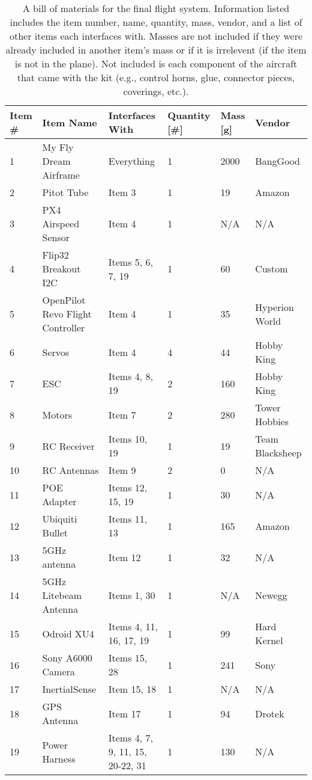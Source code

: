 \documentclass[]{auvsi_doc}
\begin{document}
	\begin{table}[h!]
		\begin{center}
			\caption{A bill of materials for the final flight system. Information listed includes the item number, name, quantity, mass, vendor, and a list of other items each interfaces with. Masses are not included if they were already included in another item's mass or if it is irrelevent (if the item is not in the plane). Not included is each component of the aircraft that came with the kit (e.g., control horns, glue, connector pieces, coverings, etc.).}
			\label{table:BOM}
			\begin{tabular}{p{1cm}p{4cm}p{3cm}p{1.5cm}p{1cm}p{2.5cm}}
				\toprule
				Item \# & Item Name & Interfaces With & Quantity [\#] & Mass [g] & Vendor \\
				\midrule
				1 & My Fly Dream Airframe & Everything & 1 & 2000 & BangGood   \\
				2 & Pitot Tube & Item 3 & 1 & 19 & Amazon \\
				3 & PX4 Airspeed Sensor & Item 4 & 1 & N/A & N/A \\
				4 & Flip32 Breakout I2C & Items 5, 6, 7, 19 & 1 & 60 & Custom \\
				5 & OpenPilot Revo \newline Flight Controller & Item 4 & 1 & 35 & Hyperion \newline World  \\
				6 & Servos & Item 4 & 4 & 44 & Hobby King \\
				7 & ESC & Items 4, 8, 19 & 2 & 160 & Hobby King \\
				8 & Motors & Item 7 & 2 & 280 & Tower \newline Hobbies \\
				9 & RC Receiver & Items 10, 19 & 1 & 19 & Team \newline Blacksheep \\
				10 & RC Antennas & Item 9 & 2 & 0 & N/A \\
				11 & POE Adapter & Items 12, 15, 19 & 1 & 30 & N/A \\
				12 & Ubiquiti Bullet & Items 11, 13 & 1 & 165 & Amazon \\
				13 & 5GHz antenna & Item 12 & 1 & 32 & N/A \\
				14 & 5GHz Litebeam \newline Antenna & Items 1, 30 & 1 & N/A & Newegg\\
				15 & Odroid XU4 & Items 4, 11, 16, 17, 19 & 1 & 99 & Hard Kernel \\
				16 & Sony A6000 Camera & Items 15, 28 & 1 & 241 & Sony \\
				17 & InertialSense & Item 15, 18 & 1 & N/A & N/A \\
				18 & GPS Antenna & Item 17 & 1 & 94 & Drotek \\
				19 & Power Harness & Items 4, 7, 9, 11, 15, 20-22, 31 & 1 & 130 & N/A \\
				\bottomrule
			\end{tabular}
		\end{center}
	\end{table}
\end{document}
